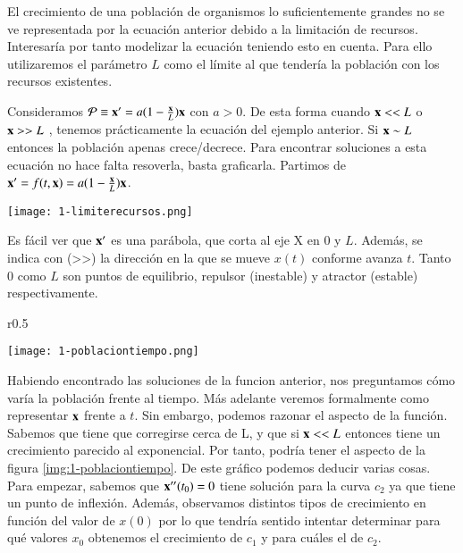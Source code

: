 El crecimiento de una población de organismos lo suficientemente grandes no se ve representada por la ecuación anterior debido a la limitación de recursos. Interesaría por tanto modelizar la ecuación teniendo esto en cuenta. Para ello utilizaremos el parámetro $L$ como el límite al que tendería la población con los recursos existentes.

\begin{eg}
    Consideramos $\mathcal{P} \equiv \mathbf{x'} = a(1-\frac{\mathbf{x}}{L})\mathbf{x}$ con $a > 0$. De esta forma cuando $\mathbf{x} << L$ o $\mathbf{x} >> L$ , tenemos prácticamente la ecuación del ejemplo anterior. Si $\mathbf{x} \sim L$ entonces la población apenas crece/decrece. Para encontrar soluciones a esta ecuación no hace falta resoverla, basta graficarla. Partimos de $\mathbf{x'} = f(t, \mathbf{x}) = a (1 - \frac{\mathbf{x}}{L})\mathbf{x}$.
    \\
    \begin{center}
        \texttt{[image: 1-limiterecursos.png]}\label{img:1-limiterecursos}
    \end{center}
    Es fácil ver que $\mathbf{x'}$ es una parábola, que corta al eje X en $0$ y $L$. Además, se indica con (>>) la dirección en la que se mueve $x(t)$ conforme avanza $t$. Tanto $0$ como $L$ son puntos de equilibrio, repulsor (inestable) y atractor (estable) respectivamente.
\end{eg}
\break

\begin{wrapfigure}{r}{0.5\textwidth}
  \begin{center}
    \texttt{[image: 1-poblaciontiempo.png]}
  \end{center}
  \caption{Población - Tiempo}\label{img:1-poblaciontiempo}
\end{wrapfigure}
Habiendo encontrado las soluciones de la funcion anterior, nos preguntamos cómo varía la población frente al tiempo. Más adelante veremos formalmente como representar $\mathbf{x}$ frente a $t$. Sin embargo, podemos razonar el aspecto de la función.
Sabemos que tiene que corregirse cerca de L, y que si $\mathbf{x} << L$ entonces tiene un crecimiento parecido al exponencial. Por tanto, podría tener el aspecto de la figura \ref{img:1-poblaciontiempo}.
De este gráfico podemos deducir varias cosas. Para empezar, sabemos que $\mathbf{x''}(t_0)=0$ tiene solución para la curva $c_2$ ya que tiene un punto de inflexión. Además, observamos distintos tipos de crecimiento en función del valor de $x(0)$ por lo que tendría sentido intentar determinar para qué valores $x_0$ obtenemos el crecimiento de $c_1$ y para cuáles el de $c_2$.

